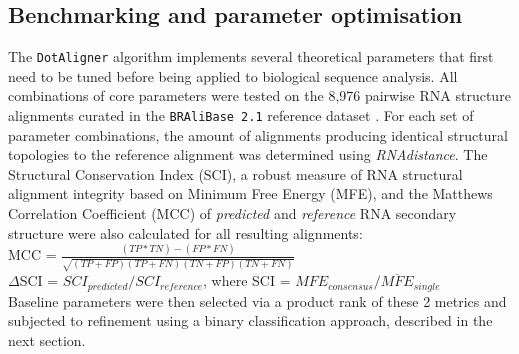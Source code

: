 \documentclass{bmcart}
\newcommand\dotaligner{\texttt{DotAligner}}
\newcommand\bralibase{\texttt{BRAliBase 2.1}}
\begin{document}
\subsection*{Benchmarking and parameter optimisation}

The \dotaligner{} algorithm implements several theoretical parameters that
first need to be tuned before being applied to biological sequence
analysis. All combinations of core parameters were tested on the 8,976
pairwise RNA structure alignments curated in the \bralibase{} reference dataset
\cite{wilm2006enhanced}. For each set of parameter combinations, the amount of
alignments producing identical structural topologies to the reference alignment
was determined using \textit{RNAdistance}. The Structural Conservation Index
(SCI), a robust measure of RNA structural alignment integrity
\cite{gruber2008strategies} based on Minimum Free Energy (MFE), and the Matthews Correlation Coefficient (MCC) of \textit{predicted} and \textit{reference} RNA secondary structure
were also calculated for all resulting alignments: \\

MCC = $\frac{(TP * TN) - (FP * FN)}{ \sqrt{ (TP + FP)(TP + FN)(TN + FP)(TN + FN) }}$\\

$\Delta$SCI = $SCI_{predicted} / SCI_{reference}$, where SCI = $ MFE_{consensus}  / \overline{MFE}_{single}  $\\

Baseline parameters were then selected via a product rank of these 2 metrics 
and subjected to refinement using a binary classification approach, described in the next section. 
\end{document}
